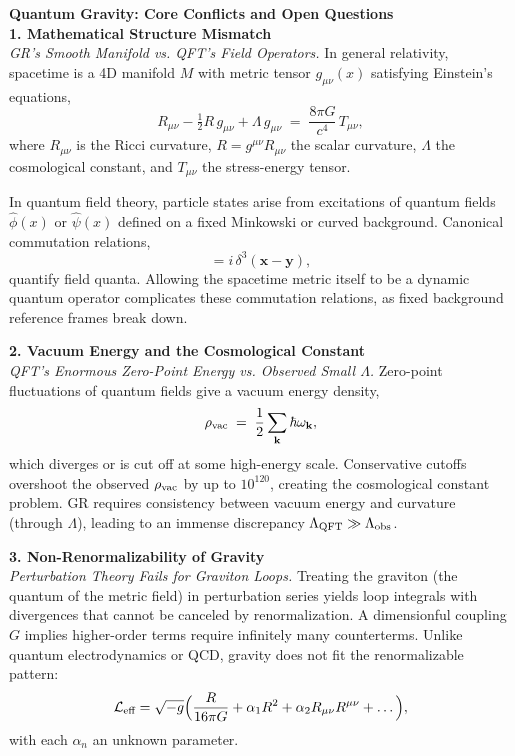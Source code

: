
\begin{technical}
    {\Large\textbf{Quantum Gravity: Core Conflicts and Open Questions}}\\[0.5em]

    \noindent\textbf{1. Mathematical Structure Mismatch}\\[0.25em]
    \textit{GR's Smooth Manifold vs. QFT's Field Operators.}
    In general relativity, spacetime is a 4D manifold $M$ with metric tensor $g_{\mu\nu}(x)$ satisfying Einstein's equations,
    \begin{equation}
        R_{\mu\nu} - \tfrac{1}{2}R\,g_{\mu\nu} + \Lambda\,g_{\mu\nu} \;=\; \frac{8\pi G}{c^4}\,T_{\mu\nu},
    \end{equation}
    where $R_{\mu\nu}$ is the Ricci curvature, $R = g^{\mu\nu}R_{\mu\nu}$ the scalar curvature, $\Lambda$ the cosmological constant, and $T_{\mu\nu}$ the stress-energy tensor. 

    In quantum field theory, particle states arise from excitations of quantum fields $\hat{\phi}(x)$ or $\hat{\psi}(x)$ defined on a fixed Minkowski or curved background. Canonical commutation relations,
    \begin{equation}
        [\hat{\phi}(t,\mathbf{x}),\,\hat{\pi}(t,\mathbf{y})] = i\,\delta^3(\mathbf{x}-\mathbf{y}),
    \end{equation}
    quantify field quanta. Allowing the spacetime metric itself to be a dynamic quantum operator complicates these commutation relations, as fixed background reference frames break down.

    \noindent\textbf{2. Vacuum Energy and the Cosmological Constant}\\[0.25em]
    \textit{QFT's Enormous Zero-Point Energy vs. Observed Small $\Lambda$.}
    Zero-point fluctuations of quantum fields give a vacuum energy density,
    \begin{equation}
        \rho_{\rm vac} \;=\; \frac{1}{2}\sum_{\mathbf{k}}\hbar\omega_{\mathbf{k}},
    \end{equation}
    which diverges or is cut off at some high-energy scale. Conservative cutoffs overshoot the observed $\rho_{\rm vac}$ by up to $10^{120}$, creating the cosmological constant problem. GR requires consistency between vacuum energy and curvature (through $\Lambda$), leading to an immense discrepancy $\Lambda_{\rm QFT} \gg \Lambda_{\rm obs}$.

    \noindent\textbf{3. Non-Renormalizability of Gravity}\\[0.25em]
    \textit{Perturbation Theory Fails for Graviton Loops.}
    Treating the graviton (the quantum of the metric field) in perturbation series yields loop integrals with divergences that cannot be canceled by renormalization. A dimensionful coupling $G$ implies higher-order terms require infinitely many counterterms. Unlike quantum electrodynamics or QCD, gravity does not fit the renormalizable pattern:
    \[
        \mathcal{L}_\text{eff} = \sqrt{-g}\Bigl(\frac{R}{16\pi G} + \alpha_1 R^2 + \alpha_2 R_{\mu\nu}R^{\mu\nu} + \dots\Bigr),
    \]
    with each $\alpha_n$ an unknown parameter.


\end{technical}

